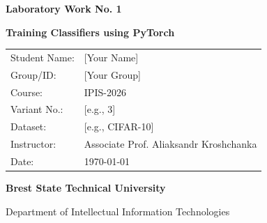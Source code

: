 \documentclass[12pt, a4paper]{article}
\begin{document}
\begin{titlepage}
    \centering
    \vspace*{2cm}
    
    {\Huge \bfseries \textcolor{primary}{Laboratory Work No. 1} \par}
    \vspace{0.5cm}
    {\LARGE \textbf{Training Classifiers using PyTorch} \par}
    \vspace{2cm}
    
    \begin{table}[h]
        \centering
        \large
        \renewcommand{\arraystretch}{1.5}
        \begin{tabular}{l l}
            Student Name: & [Your Name] \\
            Group/ID: & [Your Group] \\
            Course: & IPIS-2026 \\
            Variant No.: & [e.g., 3] \\
            Dataset: & [e.g., CIFAR-10] \\
            Instructor: & Associate Prof. Aliaksandr Kroshchanka \\
            Date: & \today \\
        \end{tabular}
    \end{table}
    
    \vfill
    {\large \textbf{Brest State Technical University} \par}
    {\large Department of Intellectual Information Technologies \par}
    \vspace*{2cm}
\end{titlepage}

\begin{abstract}
    \noindent This report details the implementation and evaluation of a Convolutional Neural Network (CNN) built with the PyTorch framework. The primary objective is to construct a neural network classifier and train it on a standard computer vision dataset from \texttt{torchvision.datasets}. The report covers model architecture design, training optimization using a specific optimizer, evaluation of testing accuracy, and comparison with state-of-the-art results.
\end{abstract}
\end{document}
